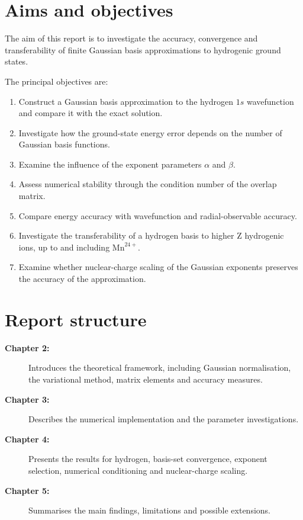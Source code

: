 \section{Aims and objectives}

The aim of this report is to investigate the
accuracy, convergence and transferability of
finite Gaussian basis approximations to
hydrogenic ground states.

The principal objectives are:

\begin{enumerate}
    \item Construct a Gaussian basis approximation
    to the hydrogen \(1s\) wavefunction and
    compare it with the exact solution.

    \item Investigate how the ground-state energy
    error depends on the number of Gaussian
    basis functions.

    \item Examine the influence of the exponent
    parameters \(\alpha\) and \(\beta\).

    \item Assess numerical stability through
    the condition number of the overlap matrix.

    \item Compare energy accuracy with
    wavefunction and radial-observable accuracy.

    \item Investigate the transferability of
    a hydrogen basis to higher Z hydrogenic ions,
    up to and including \(\mathrm{Mn}^{24+}\).

    \item Examine whether nuclear-charge
    scaling of the Gaussian exponents
    preserves the accuracy of the approximation.
\end{enumerate}


\section{Report structure}

\begin{description}
    \item[\textbf{Chapter 2:}] Introduces the theoretical framework,
    including Gaussian normalisation, the variational method,
    matrix elements and accuracy measures.

    \item[\textbf{Chapter 3:}] Describes the numerical implementation
    and the parameter investigations.

    \item[\textbf{Chapter 4:}] Presents the results for hydrogen,
    basis-set convergence, exponent selection,
    numerical conditioning and nuclear-charge scaling.

    \item[\textbf{Chapter 5:}] Summarises the main findings,
    limitations and possible extensions.
\end{description}


